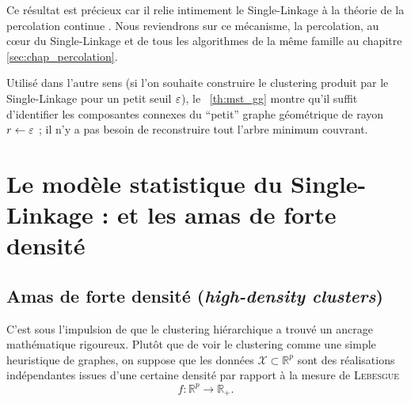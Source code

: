         
        

Ce résultat est précieux car il relie intimement le Single-Linkage à la théorie de la percolation continue \cite{MeesterRoy, penrose2003, BibiIstambul}. Nous reviendrons sur ce mécanisme, la percolation, au cœur du Single-Linkage et de tous les algorithmes de la même famille au chapitre \ref{sec:chap_percolation}.


Utilisé dans l'autre sens (si l'on souhaite construire le clustering produit par le Single-Linkage pour un petit seuil $\varepsilon$), le \Th~\ref{th:mst_gg} montre qu'il suffit d'identifier les composantes connexes du ``petit'' graphe géométrique de rayon $r \gets \varepsilon$ ; il n'y a pas besoin de reconstruire tout l'arbre minimum couvrant.

\section{Le modèle statistique du Single-Linkage :  et les amas de forte densité}


\subsection{Amas de forte densité (\emph{high-density clusters})}

C'est sous l'impulsion de  \cite{hartigan75} que le clustering hiérarchique a trouvé un ancrage mathématique rigoureux. Plutôt que de voir le clustering comme une simple heuristique de graphes, on suppose que les données $\mathcal X \subset \mathbb R^p$ sont des réalisations indépendantes issues d'une certaine densité par rapport à la mesure de \textsc{Lebesgue} 
\[
f : \mathbb R^p \to \mathbb R_+ .
\]

